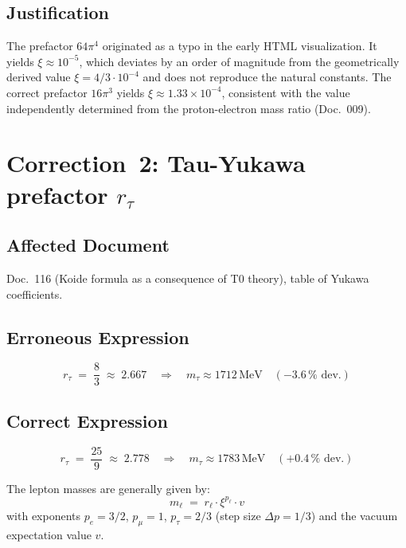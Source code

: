 \subsection*{Justification}

The prefactor $64\pi^4$ originated as a typo in the early
HTML visualization. It yields $\xi \approx 10^{-5}$, which deviates by
an order of magnitude from the geometrically derived value
$\xi = 4/3 \cdot 10^{-4}$ and does not reproduce the natural constants.
The correct prefactor $16\pi^3$ yields
$\xi \approx 1.33 \times 10^{-4}$, consistent with the value
independently determined from the proton-electron mass ratio (Doc.~009).

\section{\texorpdfstring{Correction~2: Tau-Yukawa prefactor $r_\tau$}{Correction 2: Tau-Yukawa prefactor r-tau}}

\subsection*{Affected Document}

Doc.~116 (Koide formula as a consequence of T0 theory), table of
Yukawa coefficients.

\subsection*{Erroneous Expression}

\begin{equation}
  r_\tau \;=\; \frac{8}{3} \;\approx\; 2.667
  \quad \Rightarrow \quad
  m_\tau \approx 1712\,\text{MeV} \quad (-3.6\,\% \text{ dev.})
  \tag{old -- wrong}
\end{equation}

\subsection*{Correct Expression}

\begin{equation}
  \boxed{r_\tau \;=\; \frac{25}{9} \;\approx\; 2.778}
  \quad \Rightarrow \quad
  m_\tau \approx 1783\,\text{MeV} \quad (+0.4\,\% \text{ dev.})
  \tag{190.2}
\end{equation}

The lepton masses are generally given by:
\begin{equation}
  m_\ell \;=\; r_\ell \cdot \xi^{p_\ell} \cdot v
  \tag{190.3}
\end{equation}
with exponents $p_e = 3/2$, $p_\mu = 1$, $p_\tau = 2/3$
(step size $\Delta p = 1/3$) and the vacuum expectation value $v$.


